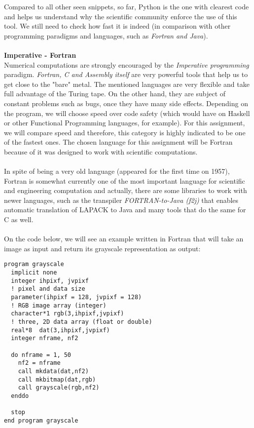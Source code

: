 \documentclass[conference]{IEEEtran}
\begin{document}
Compared to all other seen snippets, so far, Python is the one with clearest code and helps us understand why the scientific community enforce the use of this tool. We still need to check how fast it is indeed (in comparison with other programming paradigms and languages, such as \textit{Fortran and Java}).
\\\\
\textbf{ Imperative - Fortran }
\\
Numerical computations are strongly encouraged by the \textit{Imperative programming} paradigm. \textit{Fortran, C and Assembly itself} are very powerful tools that help us to get close to the "bare" metal. The mentioned languages are very flexible and take full advantage of the Turing tape. On the other hand, they are subject of constant problems such as bugs, once they have many side effects. Depending on the program, we will choose speed over code safety (which would have on Haskell or other Functional Programming languages, for example). For this assignment, we will compare speed and therefore, this category is highly indicated to be one of the fastest ones. The chosen language for this assignment will be Fortran because of it was designed to work with scientific computations.
\\\\
In spite of being a very old language (appeared for the first time on 1957), Fortran is somewhat currently one of the most important language for scientific and engineering computation and actually, there are some libraries to work with newer languages, such as the transpiler \textit{FORTRAN-to-Java (f2j)} that enables automatic translation of LAPACK to Java and many tools that do the same for C as well.
\\\\
On the code below, we will see an example written in Fortran that will take an image as input and return its grayscale representation as output:

\lstset{language=fortran}
\begin{lstlisting}[frame=single]
program grayscale
  implicit none
  integer ihpixf, jvpixf
  ! pixel and data size
  parameter(ihpixf = 128, jvpixf = 128)
  ! RGB image array (integer)
  character*1 rgb(3,ihpixf,jvpixf)
  ! three, 2D data array (float or double)
  real*8  dat(3,ihpixf,jvpixf)
  integer nframe, nf2

  do nframe = 1, 50
    nf2 = nframe
    call mkdata(dat,nf2)
    call mkbitmap(dat,rgb)
    call grayscale(rgb,nf2)
  enddo

  stop
end program grayscale
\end{lstlisting}
\end{document}
